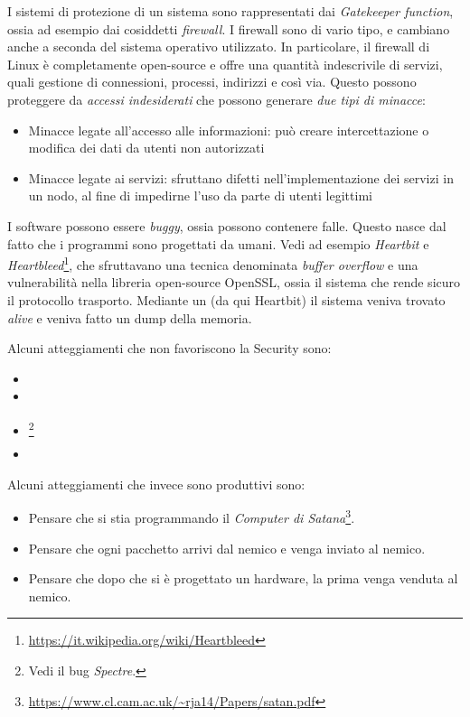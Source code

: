 \documentclass[14pt]{extreport}
\begin{document}
I sistemi di protezione di un sistema sono rappresentati dai \textit{Gatekeeper function}, ossia ad esempio dai cosiddetti \textit{firewall}. I firewall sono di vario tipo, e cambiano anche a seconda del sistema operativo utilizzato. In particolare, il firewall di Linux è completamente open-source e offre una quantità indescrivile di servizi, quali gestione di connessioni, processi, indirizzi e così via. Questo possono proteggere da \textit{accessi indesiderati} che possono generare \textit{due tipi di minacce}:

\begin{itemize}
    \item Minacce legate all'accesso alle informazioni: può creare intercettazione o modifica dei dati da utenti non autorizzati
    \item Minacce legate ai servizi: sfruttano difetti nell'implementazione dei servizi in un nodo, al fine di impedirne l'uso da parte di utenti legittimi
\end{itemize}


I software possono essere \textit{buggy}, ossia possono contenere falle. Questo nasce dal fatto che i programmi sono progettati da umani. Vedi ad esempio \textit{Heartbit} e \textit{Heartbleed}\footnote{\url{https://it.wikipedia.org/wiki/Heartbleed}}, che sfruttavano una tecnica denominata \textit{buffer overflow} e una vulnerabilità nella libreria open-source OpenSSL, ossia il sistema che rende sicuro il protocollo trasporto. Mediante un  (da qui Heartbit) il sistema veniva trovato \textit{alive} e veniva fatto un dump della memoria.

Alcuni atteggiamenti che non favoriscono la Security sono:

\begin{itemize}
    \item {}
    \item {}
    \item {}\footnote{Vedi il bug \textit{Spectre}.}
    \item {}
\end{itemize}

Alcuni atteggiamenti che invece sono produttivi sono:

\begin{itemize}
    \item Pensare che si stia programmando il \textit{Computer di Satana}\footnote{\url{https://www.cl.cam.ac.uk/~rja14/Papers/satan.pdf}}.
    \item Pensare che ogni pacchetto arrivi dal nemico e venga inviato al nemico.
    \item Pensare che dopo che si è progettato un hardware, la prima  venga venduta al nemico.
\end{itemize}
\end{document}
